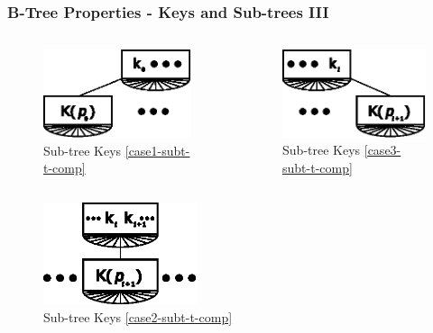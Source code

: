 \documentclass{beamer}
\begin{document}
\begin{frame}
    \frametitle{B-Tree Properties - Keys and Sub-trees III}
    \begin{columns}
        \begin{column}{0.5\textwidth}
            \begin{figure}
                \centering
                \includegraphics[width=0.75\linewidth,keepaspectratio]{resources/made/keys_comp_case1.eps}
                \caption{Sub-tree Keys \eqref{case1-subt-t-comp}}
            \end{figure}
        \end{column}
        \begin{column}{0.5\textwidth}
            \begin{figure}
                \centering
                \includegraphics[width=0.75\linewidth,keepaspectratio]{resources/made/keys_comp_case3.eps}
                \caption{Sub-tree Keys \eqref{case3-subt-t-comp}}
            \end{figure}
        \end{column}
    \end{columns}
    \begin{figure}
        \centering
        \includegraphics[width=0.4\textwidth,keepaspectratio]{resources/made/keys_comp_case2.eps}
        \caption{Sub-tree Keys \eqref{case2-subt-t-comp}}
    \end{figure}
\end{frame}
\end{document}
